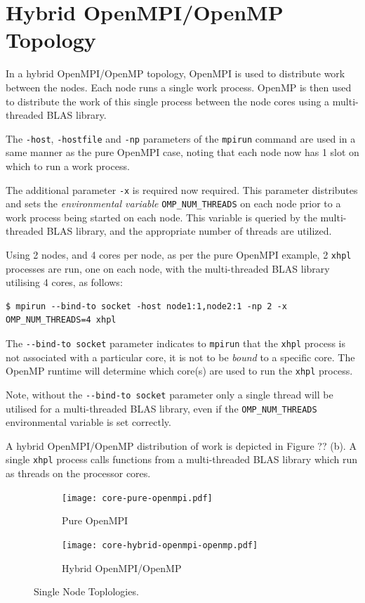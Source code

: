\documentclass{report}
\begin{document}
\section{Hybrid OpenMPI/OpenMP Topology}
In a hybrid OpenMPI/OpenMP topology, OpenMPI is used to distribute work between the nodes. Each node runs a single work process. OpenMP is then used to distribute the work of this single process between the node cores using a multi-threaded BLAS library.

The \verb|-host|, \verb|-hostfile| and \verb|-np| parameters of the \verb|mpirun| command are used in a same manner as the pure OpenMPI case, noting that each node now has 1 slot on which to run a work process.

The additional parameter \verb|-x| is required now required. This parameter distributes and sets the \emph{environmental variable} \verb|OMP_NUM_THREADS| on each node prior to a work process being started on each node. This variable is queried by the multi-threaded BLAS library, and the appropriate number of threads are utilized.

Using 2 nodes, and 4 cores per node, as per the pure OpenMPI example, 2 \verb|xhpl| processes are run, one on each node, with the multi-threaded BLAS library utilising 4 cores, as follows:

\lstset{style=type}
\begin{lstlisting}
$ mpirun --bind-to socket -host node1:1,node2:1 -np 2 -x OMP_NUM_THREADS=4 xhpl
\end{lstlisting}

The \verb|--bind-to socket| parameter indicates to \verb|mpirun| that the \verb|xhpl| process is not associated with a particular core, it is not to be \emph{bound} to a specific core. The OpenMP runtime will determine which core(s) are used to run the \verb|xhpl| process.

Note, without the \verb|--bind-to socket| parameter only a single thread will be utilised for a multi-threaded BLAS library, even if the \verb|OMP_NUM_THREADS| environmental variable is set correctly.

A hybrid OpenMPI/OpenMP distribution of work is depicted in Figure ?? (b). A single \verb|xhpl| process calls functions from a multi-threaded BLAS library which run as threads on the processor cores.

\begin{figure}
	\begin{subfigure}{1.0\textwidth}
		\centering
		\texttt{[image: core-pure-openmpi.pdf]}
		\caption{Pure OpenMPI}
		\label{fig:subim1}
	\end{subfigure}
	\par\bigskip
	\begin{subfigure}{1.0\textwidth}
		\centering
		\texttt{[image: core-hybrid-openmpi-openmp.pdf]}
		\caption{Hybrid OpenMPI/OpenMP}
		\label{fig:subim2}
	\end{subfigure}
\caption{Single Node Toplologies.}
\label{fig:image2}
\end{figure}
\end{document}
